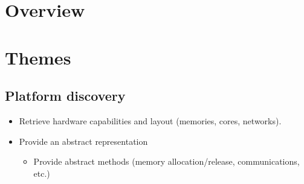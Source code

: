 \documentclass[DIV=calc, paper=a4, fontsize=11pt, twocolumn]{scrartcl}	 %
\begin{document}



\section{Overview}




\section{Themes}

\subsection{Platform discovery}

\begin{itemize}
   \item Retrieve hardware capabilities and layout (memories, cores, networks).
   \item Provide an abstract representation
   \begin{itemize}
      \item Provide abstract methods (memory allocation/release, communications, etc.)
   \end{itemize}
\end{itemize}
\end{document}
